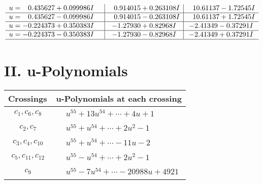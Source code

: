 \documentclass[1p]{elsarticle_modified}
\theoremstyle{definition}
\begin{document}
$$\begin{array}{c|c|c}
\begin{aligned}
u &= \phantom{-}0.435627 + 0.099986 I\end{aligned}
 & \phantom{-}0.914015 + 0.263108 I & \phantom{-}10.61137 - 1.72545 I \\ \hline\begin{aligned}
u &= \phantom{-}0.435627 - 0.099986 I\end{aligned}
 & \phantom{-}0.914015 - 0.263108 I & \phantom{-}10.61137 + 1.72545 I \\ \hline\begin{aligned}
u &= -0.224373 + 0.350383 I\end{aligned}
 & -1.27930 + 0.82968 I & -2.41349 - 0.37291 I \\ \hline\begin{aligned}
u &= -0.224373 - 0.350383 I\end{aligned}
 & -1.27930 - 0.82968 I & -2.41349 + 0.37291 I\\
 \hline 
 \end{array}$$\newpage
\newpage\renewcommand{\arraystretch}{1}
\centering \section*{ II. u-Polynomials}
\begin{tabular}{m{50pt}|m{274pt}}
Crossings & \hspace{64pt}u-Polynomials at each crossing \\
\hline $$\begin{aligned}c_{1},c_{6},c_{8}\end{aligned}$$&$\begin{aligned}
&u^{55}+13 u^{54}+\cdots+4 u+1
\end{aligned}$\\
\hline $$\begin{aligned}c_{2},c_{7}\end{aligned}$$&$\begin{aligned}
&u^{55}+u^{54}+\cdots+2 u^2-1
\end{aligned}$\\
\hline $$\begin{aligned}c_{3},c_{4},c_{10}\end{aligned}$$&$\begin{aligned}
&u^{55}+u^{54}+\cdots-11 u-2
\end{aligned}$\\
\hline $$\begin{aligned}c_{5},c_{11},c_{12}\end{aligned}$$&$\begin{aligned}
&u^{55}- u^{54}+\cdots+2 u^2-1
\end{aligned}$\\
\hline $$\begin{aligned}c_{9}\end{aligned}$$&$\begin{aligned}
&u^{55}-7 u^{54}+\cdots-20988 u+4921
\end{aligned}$\\
\hline
\end{tabular}\newpage\renewcommand{\arraystretch}{1}
\end{document}
